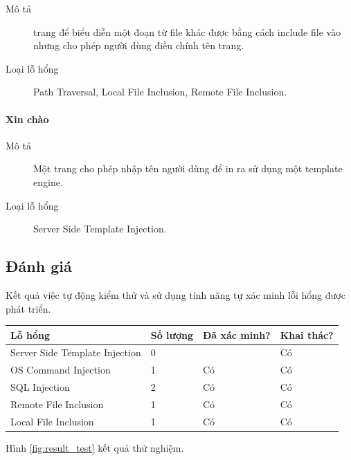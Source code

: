 \documentclass[./../main.tex]{subfiles}
\begin{document}
\begin{description}
	\item[Mô tả] trang để biểu diễn một đoạn từ file khác được bằng cách include file vào nhưng cho phép người dùng điều chính tên trang.
	\item[Loại lỗ hổng] Path Traversal, Local File Inclusion, Remote File Inclusion.
\end{description}

\paragraph{Xin chào}

\begin{description}
	\item[Mô tả] Một trang cho phép nhập tên người dùng để in ra sử dụng một template engine.
	\item[Loại lỗ hổng] Server Side Template Injection.
\end{description}

\subsection{Đánh giá}

Kết quả việc tự động kiểm thử và sử dụng tính năng tự xác minh lỗi hổng được phát triển.

\begin{table}[H]
	\begin{tabular}{|l|l|l|l|}
		\hline
		\textbf{Lỗ hổng}               & \textbf{Số lượng} & \textbf{Đã xác minh?} & \textbf{Khai thác?} \\ \hline
		Server Side Template Injection & 0                 &                       & Có                  \\ \hline
		OS Command Injection           & 1                 & Có                    & Có                  \\ \hline
		SQL Injection                  & 2                 & Có                    & Có                  \\ \hline
		Remote File Inclusion          & 1                 & Có                    & Có                  \\ \hline
		Local File Inclusion           & 1                 & Có                    & Có                  \\ \hline
	\end{tabular}
\end{table}
Hình \ref{fig:result_test} kết quả thử nghiệm.
\end{document}
